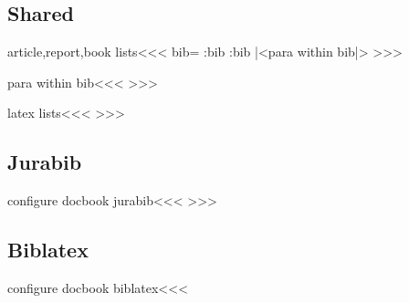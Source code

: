 \subsection{Shared}



\<article,report,book lists\><<<
%
   {\IgnorePar\EndP
      \let\en:bib=\empty}
   {\en:bib}
   {\en:bib\def\en:bib{\HCode{</member>}}%
    |<para within bib|>}
   {}
>>>





\<para within bib\><<<
>>>



\<latex lists\><<<
\LinkCommand{}
>>>


\subsection{Jurabib}


\<configure docbook jurabib\><<<
>>>

\subsection{Biblatex}


\<configure docbook biblatex\><<<
    \def\bibConfigure{%
  \ConfigureList{thebibliography}
  {\ifvmode \IgnorePar \fi \EndP \EndP
    \HCode {<bibliolist>}%
%
%
%
%
  \immediate\write\@auxout{%
      \string\BibFileName[\therefsection]{\FileName}}%
%
%
    \PushMacro \end:itm \global \let \end:itm =\empty}%
  {\ifvmode \IgnorePar \fi \EndP
    \PopMacro \end:itm \global \let \end:itm \end:itm \EndP
    \HCode {</bibliomisc></bibliomixed></bibliolist>}\ShowPar}%
  {\ifvmode \IgnorePar \fi \EndP \gHAdvance \bibN by 1
    \end:itm \global \def \end:itm {\EndP \HCode{</bibliomisc></bibliomixed>}}%
    \HCode {<bibliomixed xml:id="X\therefsection-\abx@field@entrykey"><bibliomisc>}\bgroup \bf}%
  {\ifvmode \IgnorePar \fi \EndP
    \egroup
    \HCode {</bibliomisc><bibliomisc\Hnewline xml:id="bib-\bibN">}%
    \par \ShowPar}%
 }

